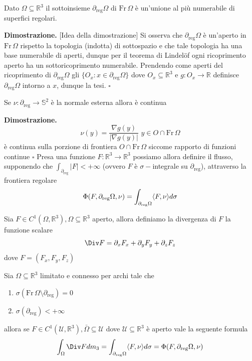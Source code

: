 %
\vspace{0.5cm}
\begin{prop}
	Dato $\Omega \subseteq \mathbb{R}^3$ il sottoinsieme $\partial_{\text{reg}} \Omega$ di $\text{Fr} \, \Omega$ è un'unione al più numerabile di superfici regolari.
\end{prop}
%
\noindent \textbf{Dimostrazione. }[Idea della dimostrazione]
Si osserva che $\partial_{\text{reg}} \Omega$ è un'aperto in $\text{Fr} \, \Omega$ rispetto la topologia (indotta) di sottospazio e che tale topologia ha una base numerabile di aperti, dunque per il teorema di Lindelöf ogni ricoprimento aperto
ha un sottoricoprimento numerabile. Prendendo come aperti del ricoprimento di $\partial_{\text{reg}} \Omega$ gli $\{O_x : x \in \partial_{\text{reg}} \Omega \}$ dove $O_x \subseteq \mathbb{R}^3$ e $g: O_x \to \mathbb{R}$ definisce $\partial_{\text{reg}} \Omega$
intorno a $x$, dunque la tesi.
\hfill $\square$
%
\vspace{0.5cm}
\begin{prop}
Se $\nu: \partial_{\text{reg}} \to \mathbb{S}^2$ è la normale esterna allora è continua
\end{prop}
%
\noindent \textbf{Dimostrazione. }
$$
\nu(y) = \frac{\nabla g(y)}{|\nabla g(y)|} \, \, y \in O \cap \text{Fr} \, \Omega
$$
è continua sulla porzione di frontiera $O \cap \text{Fr} \, \Omega$ siccome rapporto di funzioni continue
\hfill $\square$
%
Presa una funzione $F: \mathbb{R}^3 \to \mathbb{R}^3$ possiamo allora definire il flusso, supponendo che $\int_{\partial_{\text{reg}}} |F| < +\infty$ (ovvero $F$ è $\sigma-$integrale su $\partial_{\text{reg}}$), attraverso la frontiera regolare
$$
\Phi(F, \partial_{\text{reg}} \Omega, \nu) = \int_{\partial_{\text{reg}} \Omega} \langle F, \nu \rangle d \sigma
$$
%
\vspace{0.5cm}
\begin{definition}[divergenza]
	Sia $F \in C^1(\Omega, \mathbb{R}^3), \Omega \subseteq \mathbb{R}^3$ aperto, allora definiamo la divergenza di $F$ la funzione scalare
	$$
	\Div F = \partial_x F_x + \partial_y F_y + \partial_z F_z
	$$
	dove $F=(F_x, F_y, F_z)$
\end{definition}
%
\vspace{0.5cm}
\begin{theorem}[\textcolor{blue}{della divergenza}]
	Sia $\Omega \subseteq \mathbb{R}^3$ limitato e connesso per archi tale che
	\begin{enumerate}[label=\protect\circled{\arabic*}]
		\item $\sigma(\text{Fr} \, \Omega \setminus \partial_{\text{reg}}) = 0$
		\item $\sigma(\partial_{\text{reg}}) < +\infty$
	\end{enumerate}
	allora se $F \in C^1(\mathcal{U}, \mathbb{R}^3), \bar{\Omega} \subseteq \mathcal{U}$ dove $\mathcal{U} \subseteq \mathbb{R}^3$ è aperto vale la seguente formula
	$$
	\int_\Omega \Div F dm_3 = \int_{\partial_{\text{reg}} \Omega} \innerprod{F}{\nu} d\sigma = \Phi(F, \partial_{\text{reg}} \Omega, \nu)
	$$
\end{theorem}
